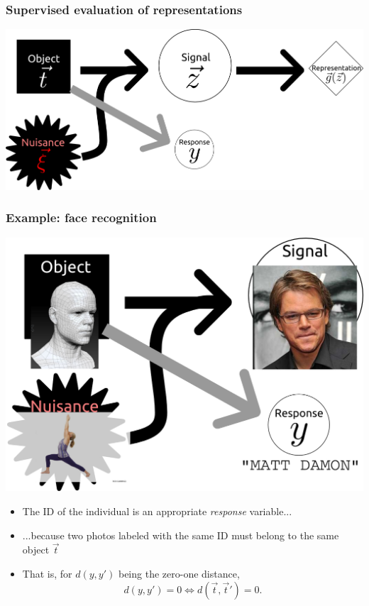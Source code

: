 \documentclass{beamer}
\begin{document}
\begin{frame}
\frametitle{Supervised evaluation of representations}
\begin{center}
\includegraphics[scale = 0.25]{defense_diagrams/supervised_eval.png}
\end{center}
\end{frame}

\begin{frame}
\frametitle{Example: face recognition}
\begin{center}
\includegraphics[scale = 0.15]{defense_diagrams/face_3.png}
\end{center}
\begin{itemize}
\item The ID of the individual is an appropriate \emph{response} variable...\pause
\item ...because two photos labeled with the same ID must belong to the same object $\vec{t}$ \pause
\item That is, for $d(y, y')$ being the zero-one distance,
\[
d(y, y') = 0 \Leftrightarrow d(\vec{t}, \vec{t}') = 0.
\]
\end{itemize}

\end{frame}
\end{document}
